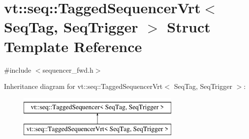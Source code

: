 \hypertarget{structvt_1_1seq_1_1_tagged_sequencer_vrt}{}\section{vt\+:\+:seq\+:\+:Tagged\+Sequencer\+Vrt$<$ Seq\+Tag, Seq\+Trigger $>$ Struct Template Reference}
\label{structvt_1_1seq_1_1_tagged_sequencer_vrt}


{\ttfamily \#include $<$sequencer\+\_\+fwd.\+h$>$}

Inheritance diagram for vt\+:\+:seq\+:\+:Tagged\+Sequencer\+Vrt$<$ Seq\+Tag, Seq\+Trigger $>$\+:\begin{figure}[H]
\begin{center}
\leavevmode
\includegraphics[height=2.000000cm]{structvt_1_1seq_1_1_tagged_sequencer_vrt}
\end{center}
\end{figure}
